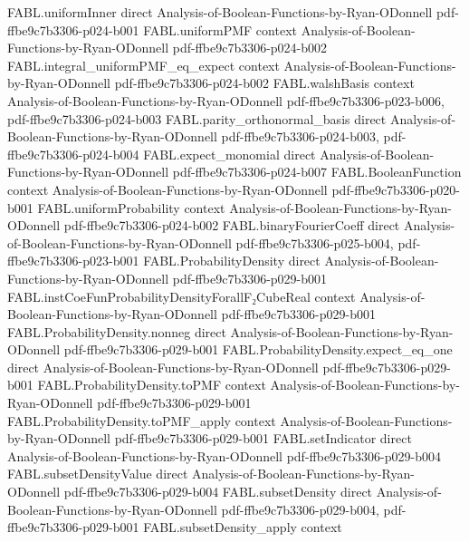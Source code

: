 \begin{theorem}
\proofstep
  {FABL.uniformInner}
  {direct}
  {Analysis-of-Boolean-Functions-by-Ryan-ODonnell}
  {pdf-ffbe9c7b3306-p024-b001}
\proofstep
  {FABL.uniformPMF}
  {context}
  {Analysis-of-Boolean-Functions-by-Ryan-ODonnell}
  {pdf-ffbe9c7b3306-p024-b002}
\proofstep
  {FABL.integral_uniformPMF_eq_expect}
  {context}
  {Analysis-of-Boolean-Functions-by-Ryan-ODonnell}
  {pdf-ffbe9c7b3306-p024-b002}
\proofstep
  {FABL.walshBasis}
  {context}
  {Analysis-of-Boolean-Functions-by-Ryan-ODonnell}
  {pdf-ffbe9c7b3306-p023-b006,
    pdf-ffbe9c7b3306-p024-b003}
\proofstep
  {FABL.parity_orthonormal_basis}
  {direct}
  {Analysis-of-Boolean-Functions-by-Ryan-ODonnell}
  {pdf-ffbe9c7b3306-p024-b003,
    pdf-ffbe9c7b3306-p024-b004}
\proofstep
  {FABL.expect_monomial}
  {direct}
  {Analysis-of-Boolean-Functions-by-Ryan-ODonnell}
  {pdf-ffbe9c7b3306-p024-b007}
\proofstep
  {FABL.BooleanFunction}
  {context}
  {Analysis-of-Boolean-Functions-by-Ryan-ODonnell}
  {pdf-ffbe9c7b3306-p020-b001}
\proofstep
  {FABL.uniformProbability}
  {context}
  {Analysis-of-Boolean-Functions-by-Ryan-ODonnell}
  {pdf-ffbe9c7b3306-p024-b002}
\proofstep
  {FABL.binaryFourierCoeff}
  {direct}
  {Analysis-of-Boolean-Functions-by-Ryan-ODonnell}
  {pdf-ffbe9c7b3306-p025-b004,
    pdf-ffbe9c7b3306-p023-b001}
\proofstep
  {FABL.ProbabilityDensity}
  {direct}
  {Analysis-of-Boolean-Functions-by-Ryan-ODonnell}
  {pdf-ffbe9c7b3306-p029-b001}
\proofstep
  {FABL.instCoeFunProbabilityDensityForallF₂CubeReal}
  {context}
  {Analysis-of-Boolean-Functions-by-Ryan-ODonnell}
  {pdf-ffbe9c7b3306-p029-b001}
\proofstep
  {FABL.ProbabilityDensity.nonneg}
  {direct}
  {Analysis-of-Boolean-Functions-by-Ryan-ODonnell}
  {pdf-ffbe9c7b3306-p029-b001}
\proofstep
  {FABL.ProbabilityDensity.expect_eq_one}
  {direct}
  {Analysis-of-Boolean-Functions-by-Ryan-ODonnell}
  {pdf-ffbe9c7b3306-p029-b001}
\proofstep
  {FABL.ProbabilityDensity.toPMF}
  {context}
  {Analysis-of-Boolean-Functions-by-Ryan-ODonnell}
  {pdf-ffbe9c7b3306-p029-b001}
\proofstep
  {FABL.ProbabilityDensity.toPMF_apply}
  {context}
  {Analysis-of-Boolean-Functions-by-Ryan-ODonnell}
  {pdf-ffbe9c7b3306-p029-b001}
\proofstep
  {FABL.setIndicator}
  {direct}
  {Analysis-of-Boolean-Functions-by-Ryan-ODonnell}
  {pdf-ffbe9c7b3306-p029-b004}
\proofstep
  {FABL.subsetDensityValue}
  {direct}
  {Analysis-of-Boolean-Functions-by-Ryan-ODonnell}
  {pdf-ffbe9c7b3306-p029-b004}
\proofstep
  {FABL.subsetDensity}
  {direct}
  {Analysis-of-Boolean-Functions-by-Ryan-ODonnell}
  {pdf-ffbe9c7b3306-p029-b004,
    pdf-ffbe9c7b3306-p029-b001}
\proofstep
  {FABL.subsetDensity_apply}
  {context}

\end{theorem}
